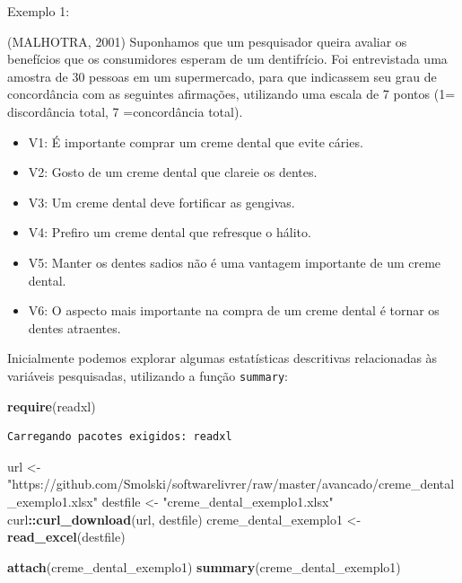 \documentclass[12pt,brazil,oneside]{book}
\newenvironment{Shaded}{\begin{snugshade}}{\end{snugshade}}
\newcommand{\KeywordTok}[1]{\textcolor[rgb]{0.13,0.29,0.53}{\textbf{#1}}}
\newcommand{\NormalTok}[1]{#1}
\newcommand{\OperatorTok}[1]{\textcolor[rgb]{0.81,0.36,0.00}{\textbf{#1}}}
\newcommand{\StringTok}[1]{\textcolor[rgb]{0.31,0.60,0.02}{#1}}
\providecommand{\tightlist}{%
  \setlength{\itemsep}{0pt}\setlength{\parskip}{0pt}}
\begin{document}
Exemplo 1:

(MALHOTRA, 2001) Suponhamos que um pesquisador queira avaliar os
benefícios que os consumidores esperam de um dentifrício. Foi
entrevistada uma amostra de 30 pessoas em um supermercado, para que
indicassem seu grau de concordância com as seguintes afirmações,
utilizando uma escala de 7 pontos (1= discordância total, 7
=concordância total).

\begin{itemize}
\tightlist
\item
  V1: É importante comprar um creme dental que evite cáries.
\item
  V2: Gosto de um creme dental que clareie os dentes.
\item
  V3: Um creme dental deve fortificar as gengivas.
\item
  V4: Prefiro um creme dental que refresque o hálito.
\item
  V5: Manter os dentes sadios não é uma vantagem importante de um creme
  dental.
\item
  V6: O aspecto mais importante na compra de um creme dental é tornar os
  dentes atraentes.
\end{itemize}

Inicialmente podemos explorar algumas estatísticas descritivas
relacionadas às variáveis pesquisadas, utilizando a função
\texttt{summary}:

\begin{Shaded}
\begin{Highlighting}[]
\KeywordTok{require}\NormalTok{(readxl)}
\end{Highlighting}
\end{Shaded}

\begin{verbatim}
Carregando pacotes exigidos: readxl
\end{verbatim}

\begin{Shaded}
\begin{Highlighting}[]
\NormalTok{url <-}\StringTok{ "https://github.com/Smolski/softwarelivrer/raw/master/avancado/creme_dental_exemplo1.xlsx"}
\NormalTok{destfile <-}\StringTok{ "creme_dental_exemplo1.xlsx"}
\NormalTok{curl}\OperatorTok{::}\KeywordTok{curl_download}\NormalTok{(url, destfile)}
\NormalTok{creme_dental_exemplo1 <-}\StringTok{ }\KeywordTok{read_excel}\NormalTok{(destfile)}

\KeywordTok{attach}\NormalTok{(creme_dental_exemplo1)}
\KeywordTok{summary}\NormalTok{(creme_dental_exemplo1)}
\end{Highlighting}
\end{Shaded}
\end{document}
